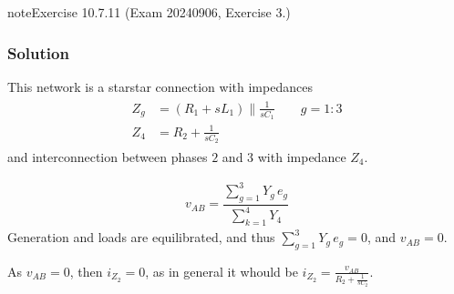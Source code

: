 \documentclass[letterpaper,10pt,italian]{jupyterBook}
\begin{document}
\begin{sphinxadmonition}{note}{Exercise 10.7.11 (Exam 2024\sphinxhyphen{}09\sphinxhyphen{}06, Exercise 3.)}



\begin{figure}[htbp]
\centering

\noindent{}
\end{figure}
\subsubsection*{Solution}

\sphinxAtStartPar
This network is a star\sphinxhyphen{}star connection with impedances
\begin{equation*}
\begin{split}\begin{aligned}
  Z_g & = ( R_1 + s L_1 ) \parallel \frac{1}{s C_1} \qquad g = 1:3 \\
  Z_4 & = R_2 + \frac{1}{s C_2}
\end{aligned}\end{split}
\end{equation*}
\sphinxAtStartPar
and inter\sphinxhyphen{}connection between phases \(2\) and \(3\) with impedance \(Z_4\).



\sphinxAtStartPar
{}
\begin{equation*}
\begin{split}v_{AB} = \dfrac{ \sum_{g=1}^{3} Y_g \, e_g }{\sum_{k=1}^{4} Y_4}\end{split}
\end{equation*}
\sphinxAtStartPar
Generation and loads are equilibrated, and thus \(\sum_{g=1}^{3} Y_g \, e_g = 0\), and \(v_{AB} = 0\).

\sphinxAtStartPar
{} As \(v_{AB}=0\), then \(i_{Z_2} = 0\), as in general it whould be \(i_{Z_2} = \frac{v_{AB}}{R_2 + \frac{1}{sC_2}}\).


\end{sphinxadmonition}
\end{document}
